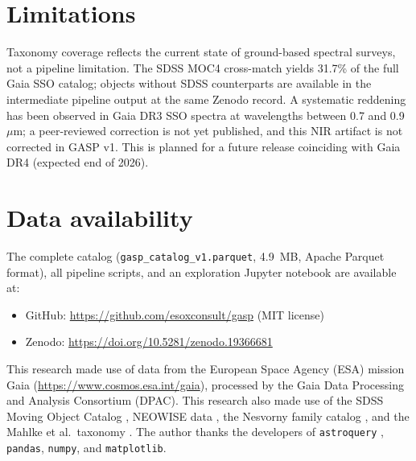 \documentclass{aa}
\begin{document}
\section{Limitations}

Taxonomy coverage reflects the current state of ground-based
spectral surveys, not a pipeline limitation. The SDSS MOC4
cross-match yields 31.7\% of the full Gaia SSO catalog;
objects without SDSS counterparts are available in the
intermediate pipeline output at the same Zenodo record.
A systematic reddening has been observed in Gaia DR3 SSO
spectra at wavelengths between 0.7 and 0.9~$\mu$m; a
peer-reviewed correction is not yet published, and this
NIR artifact is not corrected in GASP v1. This is planned
for a future release coinciding with Gaia DR4
(expected end of 2026).

\section{Data availability}

The complete catalog (\texttt{gasp\_catalog\_v1.parquet},
4.9~MB, Apache Parquet format), all pipeline scripts, and
an exploration Jupyter notebook are available at:
\begin{itemize}
\item GitHub: \url{https://github.com/esoxconsult/gasp}
      (MIT license)
\item Zenodo: \url{https://doi.org/10.5281/zenodo.19366681}
\end{itemize}

\begin{acknowledgements}
This research made use of data from the European Space Agency
(ESA) mission Gaia (\url{https://www.cosmos.esa.int/gaia}),
processed by the Gaia Data Processing and Analysis Consortium
(DPAC). This research also made use of the SDSS Moving Object
Catalog \citep{Ivezic2001}, NEOWISE data \citep{Masiero2011},
the Nesvorny family catalog \citep{Nesvorny2015}, and the
Mahlke et al.\ taxonomy \citep{Mahlke2022}. The author thanks
the developers of \texttt{astroquery} \citep{Ginsburg2019},
\texttt{pandas}, \texttt{numpy}, and \texttt{matplotlib}.
\end{acknowledgements}



\end{document}
